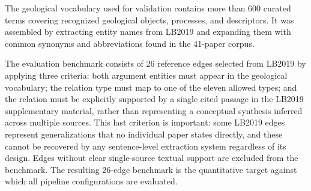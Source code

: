 \documentclass[10pt]{article}
\begin{document}
The geological vocabulary used for validation contains more
than 600 curated terms covering recognized geological objects,
processes, and descriptors.
It was assembled by extracting entity names from LB2019 and
expanding them with common synonyms and abbreviations found
in the 41-paper corpus.

The evaluation benchmark consists of 26 reference edges
selected from LB2019 by applying three criteria: both argument
entities must appear in the geological vocabulary; the relation
type must map to one of the eleven allowed types; and the
relation must be explicitly supported by a single cited passage
in the LB2019 supplementary material, rather than representing
a conceptual synthesis inferred across multiple sources.
This last criterion is important: some LB2019 edges represent
generalizations that no individual paper states directly, and
these cannot be recovered by any sentence-level extraction
system regardless of its design.
Edges without clear single-source textual support are excluded
from the benchmark.
The resulting 26-edge benchmark is the quantitative target
against which all pipeline configurations are evaluated.
\end{document}

